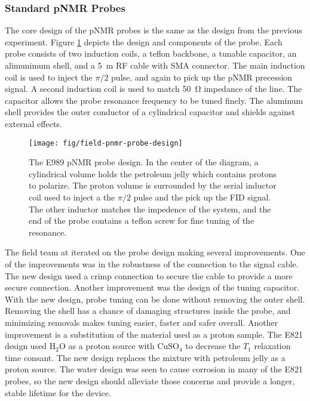\subsubsection{Standard pNMR Probes}

The core design of the pNMR probes is the same as the design from the previous experiment. Figure \ref{fig:field-pnmr-probe-design} depicts the design and components of the probe.  Each probe consists of two induction coils, a teflon backbone, a tunable capacitor, an alimunimum shell, and a \SI{5}{\meter} RF cable with SMA connector.  The main induction coil is used to inject the $\pi/2$ pulse, and again to pick up the pNMR precession signal.  A second induction coil is used to match \SI{50}{\ohm} impedance of the line.  The capacitor allows the probe resonance frequency to be tuned finely.  The aluminum shell provides the outer conductor of a cylindrical capacitor and shields against external effects.

\begin{figure}
\centering
\texttt{[image: fig/field-pnmr-probe-design]}
\caption{
    The E989 pNMR probe design.  In the center of the diagram, a cylindrical volume holds the petroleum jelly which contains protons to polarize.  The proton volume is surrounded by the serial inductor coil used to inject a the $\pi/2$ pulse and the pick up the FID signal.  The other inductor matches the impedence of the system, and the end of the probe contains a teflon screw for fine tuning of the resonance.
    \label{fig:field-pnmr-probe-design}
}
\end{figure}

The field team at \uw iterated on the probe design making several improvements.  One of the improvements was in the robustness of the connection to the signal cable.  The new design used a crimp connection to secure the cable to provide a more secure connection.  Another improvement was the design of the tuning capacitor.  With the new design, probe tuning can be done without removing the outer shell.  Removing the shell has a chance of damaging structures inside the probe, and minimizing removals makes tuning easier, faster and safer overall.  Another improvement is a substitution of the material used as a proton sample.  The E821 design used $\mathrm{H_2O}$ as a proton source with $\mathrm{CuSO_4}$ to decrease the $T_1$ relaxation time consant.  The new design replaces the mixture with petroleum jelly as a proton source.  The water design was seen to cause corrosion in many of the E821 probes, so the new design should alleviate those concerns and provide a longer, stable lifetime for the device.

